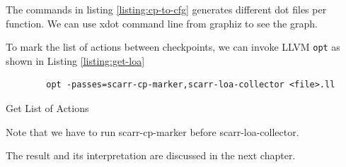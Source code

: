 The commands in listing \ref{listing:cp-to-cfg} generates different dot files per function. We can use xdot command line from graphiz to see the graph. 

To mark the list of actions between checkpoints, we can invoke LLVM \texttt{opt} as shown in Listing \ref{listing:get-loa}

\begin{listing}
    \begin{verbatim}
        opt -passes=scarr-cp-marker,scarr-loa-collector <file>.ll
    \end{verbatim}
    \caption{Get List of Actions}    
    \label{listing:get-loa}
\end{listing}

Note that we have to run scarr-cp-marker before scarr-loa-collector.

The result and its interpretation are discussed in the next chapter.